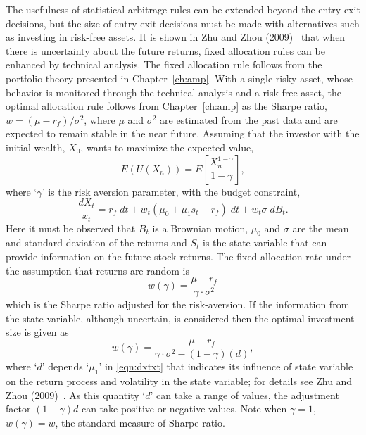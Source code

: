 The usefulness of statistical arbitrage rules can be extended beyond the entry-exit decisions, but the size of entry-exit decisions must be made with alternatives such as investing in risk-free assets. It is shown in Zhu and Zhou (2009)~\cite{zhuzhou09} that when there is uncertainty about the future returns, fixed allocation rules can be enhanced by technical analysis. The fixed allocation rule follows from the portfolio theory presented in Chapter~\ref{ch:amp}. With a single risky asset, whose behavior is monitored through the technical analysis and a risk free asset, the optimal allocation rule follows from Chapter~\ref{ch:amp} as the Sharpe ratio, $w= (\mu - r_f)/\sigma^2$, where $\mu$ and $\sigma^2$ are estimated from the past data and are expected to remain stable in the near future. Assuming that the investor with the initial wealth, $X_0$, wants to maximize the expected value,
	\begin{equation} \label{eqn:euxn}
	E(U(X_n))= E \left[ \dfrac{X_n^{1-\gamma}}{1 - \gamma}\right],
	\end{equation}
where `$\gamma$' is the risk aversion parameter, with the budget constraint,
	\begin{equation} \label{eqn:dxtxt}
	\dfrac{dX_t}{x_t}= r_f \; dt + w_t (\mu_0 + \mu_1 s_t - r_f) \; dt + w_t \sigma \; dB_t.
	\end{equation}
Here it must be observed that $B_t$ is a Brownian motion, $\mu_0$ and $\sigma$ are the mean and standard deviation of the returns and $S_t$ is the state variable that can provide information on the future stock returns. The fixed allocation rate under the assumption that returns are random is
	\begin{equation} \label{eqn:wgamma}
	w(\gamma)= \dfrac{\mu - r_f}{\gamma \cdot \sigma^2}
	\end{equation}
which is the Sharpe ratio adjusted for the risk-aversion. If the information from the state variable, although uncertain, is considered then the optimal investment size is given as
	\begin{equation} \label{eqn:wgamma2}
	w(\gamma)= \dfrac{\mu - r_f}{\gamma \cdot \sigma^2 - (1-\gamma)(d)},
	\end{equation}
where `$d$' depends `$\mu_1$' in \eqref{eqn:dxtxt} that indicates its influence of state variable on the return process and volatility in the state variable; for details see Zhu and Zhou (2009)~\cite{zhuzhou09}. As this quantity `$d$' can take a range of values, the adjustment factor $(1-\gamma)d$ can take positive or negative values. Note when $\gamma=1$, $w(\gamma)= w$, the standard measure of Sharpe ratio. 


